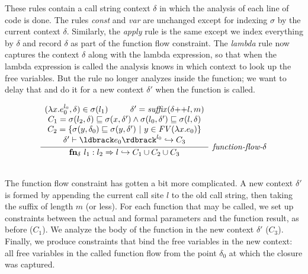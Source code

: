 \documentclass[11pt]{article}
\begin{document}
These rules contain a call string context $\delta$ in which the analysis of each line of code is done.  The rules \textit{const} and \textit{var} are unchanged except for indexing $\sigma$ by the current context $\delta$.  Similarly, the \textit{apply} rule is the same except we index everything by $\delta$ and record $\delta$ as part of the function flow constraint.  The \textit{lambda} rule now captures the context $\delta$ along with the lambda expression, so that when the lambda expression is called the analysis knows in which context to look up the free variables.  But the rule no longer analyzes inside the function; we want to delay that and do it for a new context $\delta'$ when the function is called.

\[
\begin{array}{c}
\infer[\textit{function-flow-$\delta$}]
	{\textbf{fn}_\delta~l_1: l_2 \Rightarrow l \hookrightarrow C_1 \cup C_2 \cup C_3}
	{\begin{array}{c}
        (\lambda x . e_0^{l_0}, \delta) \in \sigma(l_1) ~~~~~~~~ \delta' = \mathit{suffix}(\delta {+}{+} l, m) \\
        C_1 = \sigma(l_2,\delta) \alap \sigma(x,\delta') \land \sigma(l_0,\delta') \alap \sigma(l,\delta) \\
        C_2 = \{ \sigma(y,\delta_0) \alap \sigma(y, \delta') ~|~ y \in \mathit{FV}(\lambda x . e_0) \} \\
        \delta' \vdash \parg{e_0}^{l_0} \hookrightarrow C_3 \\
    \end{array}
    }\\[3ex]
	
\end{array}
\]

The function flow constraint has gotten a bit more complicated.  A new context $\delta'$ is formed by appending the current call site $l$ to the old call string, then taking the suffix of length $m$ (or less).  For each function that may be called, we set up constraints between the actual and formal parameters and the function result, as before ($C_1$).  We analyze the body of the function in the new context $\delta'$ ($C_3$).  Finally, we produce constraints that bind the free variables in the new context: all free variables in the called function flow from the point $\delta_0$ at which the closure was captured.


\end{document}
